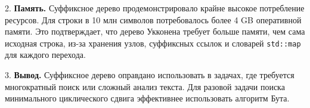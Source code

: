 2. \textbf{Память.} Суффиксное дерево продемонстрировало крайне высокое потребление ресурсов. Для строки в 10 млн символов потребовалось более 4 GB оперативной памяти. Это подтверждает, что дерево Укконена требует больше памяти, чем сама исходная строка, из-за хранения узлов, суффиксных ссылок и словарей \texttt{std::map} для каждого перехода.

3. \textbf{Вывод.} Суффиксное дерево оправдано использовать в задачах, где требуется многократный поиск или сложный анализ текста. Для разовой задачи поиска минимального циклического сдвига эффективнее использовать алгоритм Бута.

\pagebreak